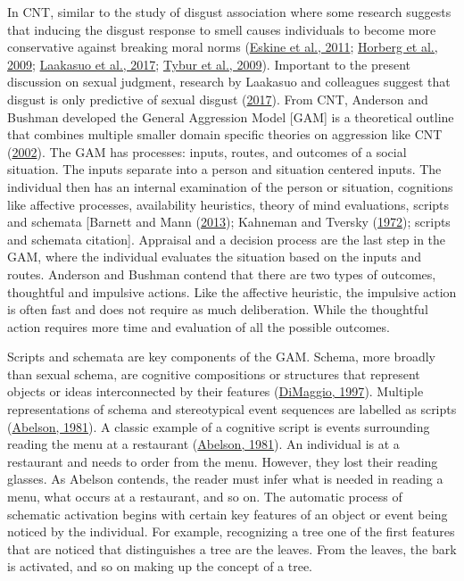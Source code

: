 \documentclass[
  donotrepeattitle,doc, 12pt, a4paper,floatsintext]{apa7}
\begin{document}
In CNT, similar to the study of disgust association where some research suggests that inducing the disgust response to smell causes individuals to become more conservative against breaking moral norms (\protect\hyperlink{ref-eskine2011}{Eskine et al., 2011}; \protect\hyperlink{ref-horberg2009}{Horberg et al., 2009}; \protect\hyperlink{ref-laakasuo2017}{Laakasuo et al., 2017}; \protect\hyperlink{ref-tybur2009}{Tybur et al., 2009}). Important to the present discussion on sexual judgment, research by Laakasuo and colleagues suggest that disgust is only predictive of sexual disgust (\protect\hyperlink{ref-laakasuo2017}{2017}). From CNT, Anderson and Bushman developed the General Aggression Model {[}GAM{]} is a theoretical outline that combines multiple smaller domain specific theories on aggression like CNT (\protect\hyperlink{ref-anderson2002}{2002}). The GAM has processes: inputs, routes, and outcomes of a social situation. The inputs separate into a person and situation centered inputs. The individual then has an internal examination of the person or situation, cognitions like affective processes, availability heuristics, theory of mind evaluations, scripts and schemata {[}Barnett and Mann (\protect\hyperlink{ref-barnett2013}{2013}); Kahneman and Tversky (\protect\hyperlink{ref-kahneman1972}{1972}); scripts and schemata citation{]}. Appraisal and a decision process are the last step in the GAM, where the individual evaluates the situation based on the inputs and routes. Anderson and Bushman contend that there are two types of outcomes, thoughtful and impulsive actions. Like the affective heuristic, the impulsive action is often fast and does not require as much deliberation. While the thoughtful action requires more time and evaluation of all the possible outcomes.

Scripts and schemata are key components of the GAM. Schema, more broadly than sexual schema, are cognitive compositions or structures that represent objects or ideas interconnected by their features (\protect\hyperlink{ref-dimaggio1997}{DiMaggio, 1997}). Multiple representations of schema and stereotypical event sequences are labelled as scripts (\protect\hyperlink{ref-abelson1981}{Abelson, 1981}). A classic example of a cognitive script is events surrounding reading the menu at a restaurant (\protect\hyperlink{ref-abelson1981}{Abelson, 1981}). An individual is at a restaurant and needs to order from the menu. However, they lost their reading glasses. As Abelson contends, the reader must infer what is needed in reading a menu, what occurs at a restaurant, and so on. The automatic process of schematic activation begins with certain key features of an object or event being noticed by the individual. For example, recognizing a tree one of the first features that are noticed that distinguishes a tree are the leaves. From the leaves, the bark is activated, and so on making up the concept of a tree.
\end{document}
